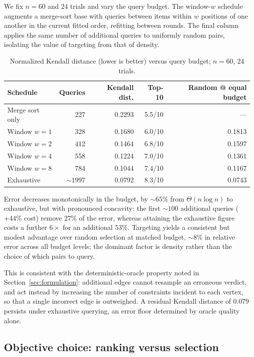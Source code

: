 \documentclass[11pt,a4paper]{article}
\begin{document}
We fix $n = 60$ and $24$ trials and vary the query budget. The window-$w$
schedule augments a merge-sort base with queries between items within $w$
positions of one another in the current fitted order, refitting between rounds.
The final column applies the same number of additional queries to uniformly
random pairs, isolating the value of targeting from that of density.

\begin{table}[h]
\centering
\begin{tabular}{lrrrr}
\toprule
Schedule & Queries & Kendall dist. & Top-10 & Random @ equal budget \\
\midrule
Merge sort only      &  227 & 0.2293 & 5.5/10 & --- \\
Window $w=1$         &  328 & 0.1680 & 6.0/10 & 0.1813 \\
Window $w=2$         &  412 & 0.1464 & 6.8/10 & 0.1597 \\
Window $w=4$         &  558 & 0.1224 & 7.0/10 & 0.1361 \\
Window $w=8$         &  784 & 0.1044 & 7.4/10 & 0.1167 \\
Exhaustive           & ${\sim}1997$ & 0.0792 & 8.3/10 & 0.0743 \\
\bottomrule
\end{tabular}
\caption{Normalized Kendall distance (lower is better) versus query budget;
$n=60$, $24$ trials.}
\label{tab:density}
\end{table}

Error decreases monotonically in the budget, by ${\sim}65\%$ from
$\Theta(n\log n)$ to exhaustive, but with pronounced concavity: the first
${\sim}100$ additional queries ($+44\%$ cost) remove $27\%$ of the error, whereas
attaining the exhaustive figure costs a further $6\times$ for an additional
$53\%$. Targeting yields a consistent but modest advantage over random selection
at matched budget, ${\sim}8\%$ in relative error across all budget levels; the
dominant factor is density rather than the choice of which pairs to query.

This is consistent with the deterministic-oracle property noted in
Section~\ref{sec:formulation}: additional edges cannot resample an erroneous
verdict, and act instead by increasing the number of constraints incident to each
vertex, so that a single incorrect edge is outweighed. A residual Kendall
distance of $0.079$ persists under exhaustive querying, an error floor
determined by oracle quality alone.

\subsection{Objective choice: ranking versus selection}
\label{sec:topk}
\end{document}
